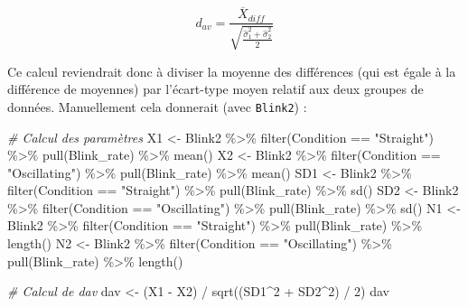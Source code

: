 \documentclass[
]{book}
\newenvironment{Shaded}{\begin{snugshade}}{\end{snugshade}}
\newcommand{\CommentTok}[1]{\textcolor[rgb]{0.56,0.35,0.01}{\textit{#1}}}
\newcommand{\DecValTok}[1]{\textcolor[rgb]{0.00,0.00,0.81}{#1}}
\newcommand{\FunctionTok}[1]{\textcolor[rgb]{0.00,0.00,0.00}{#1}}
\newcommand{\NormalTok}[1]{#1}
\newcommand{\OtherTok}[1]{\textcolor[rgb]{0.56,0.35,0.01}{#1}}
\newcommand{\SpecialCharTok}[1]{\textcolor[rgb]{0.00,0.00,0.00}{#1}}
\newcommand{\StringTok}[1]{\textcolor[rgb]{0.31,0.60,0.02}{#1}}
\begin{document}
\[d_{av} = \frac{\overline{X} _{diff}}{\sqrt{\frac{\hat{\sigma}_{1}^2 + \hat{\sigma}_{2}^2} {2}}}\]

Ce calcul reviendrait donc à diviser la moyenne des différences (qui est égale à la différence de moyennes) par l'écart-type moyen relatif aux deux groupes de données. Manuellement cela donnerait (avec \texttt{Blink2}) :

\begin{Shaded}
\begin{Highlighting}[]
\CommentTok{\# Calcul des paramètres}
\NormalTok{X1 }\OtherTok{\textless{}{-}}\NormalTok{ Blink2 }\SpecialCharTok{\%\textgreater{}\%} \FunctionTok{filter}\NormalTok{(Condition }\SpecialCharTok{==} \StringTok{"Straight"}\NormalTok{) }\SpecialCharTok{\%\textgreater{}\%} \FunctionTok{pull}\NormalTok{(Blink\_rate) }\SpecialCharTok{\%\textgreater{}\%} \FunctionTok{mean}\NormalTok{()}
\NormalTok{X2 }\OtherTok{\textless{}{-}}\NormalTok{ Blink2 }\SpecialCharTok{\%\textgreater{}\%} \FunctionTok{filter}\NormalTok{(Condition }\SpecialCharTok{==} \StringTok{"Oscillating"}\NormalTok{) }\SpecialCharTok{\%\textgreater{}\%} \FunctionTok{pull}\NormalTok{(Blink\_rate) }\SpecialCharTok{\%\textgreater{}\%} \FunctionTok{mean}\NormalTok{()}
\NormalTok{SD1 }\OtherTok{\textless{}{-}}\NormalTok{ Blink2 }\SpecialCharTok{\%\textgreater{}\%} \FunctionTok{filter}\NormalTok{(Condition }\SpecialCharTok{==} \StringTok{"Straight"}\NormalTok{) }\SpecialCharTok{\%\textgreater{}\%} \FunctionTok{pull}\NormalTok{(Blink\_rate) }\SpecialCharTok{\%\textgreater{}\%} \FunctionTok{sd}\NormalTok{()}
\NormalTok{SD2 }\OtherTok{\textless{}{-}}\NormalTok{ Blink2 }\SpecialCharTok{\%\textgreater{}\%} \FunctionTok{filter}\NormalTok{(Condition }\SpecialCharTok{==} \StringTok{"Oscillating"}\NormalTok{) }\SpecialCharTok{\%\textgreater{}\%} \FunctionTok{pull}\NormalTok{(Blink\_rate) }\SpecialCharTok{\%\textgreater{}\%} \FunctionTok{sd}\NormalTok{()}
\NormalTok{N1 }\OtherTok{\textless{}{-}}\NormalTok{ Blink2 }\SpecialCharTok{\%\textgreater{}\%} \FunctionTok{filter}\NormalTok{(Condition }\SpecialCharTok{==} \StringTok{"Straight"}\NormalTok{) }\SpecialCharTok{\%\textgreater{}\%} \FunctionTok{pull}\NormalTok{(Blink\_rate) }\SpecialCharTok{\%\textgreater{}\%} \FunctionTok{length}\NormalTok{()}
\NormalTok{N2 }\OtherTok{\textless{}{-}}\NormalTok{ Blink2 }\SpecialCharTok{\%\textgreater{}\%} \FunctionTok{filter}\NormalTok{(Condition }\SpecialCharTok{==} \StringTok{"Oscillating"}\NormalTok{) }\SpecialCharTok{\%\textgreater{}\%} \FunctionTok{pull}\NormalTok{(Blink\_rate) }\SpecialCharTok{\%\textgreater{}\%} \FunctionTok{length}\NormalTok{()}

\CommentTok{\# Calcul de dav}
\NormalTok{dav }\OtherTok{\textless{}{-}}\NormalTok{ (X1 }\SpecialCharTok{{-}}\NormalTok{ X2) }\SpecialCharTok{/} \FunctionTok{sqrt}\NormalTok{((SD1}\SpecialCharTok{\^{}}\DecValTok{2} \SpecialCharTok{+}\NormalTok{ SD2}\SpecialCharTok{\^{}}\DecValTok{2}\NormalTok{) }\SpecialCharTok{/} \DecValTok{2}\NormalTok{)}
\NormalTok{dav}
\end{Highlighting}
\end{Shaded}
\end{document}
